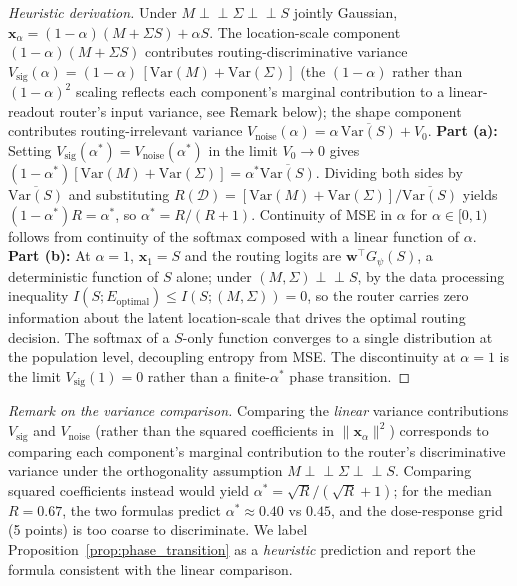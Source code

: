\documentclass{article}
\begin{document}
\begin{proof}[Heuristic derivation]
Under $M\perp\!\!\!\perp\Sigma\perp\!\!\!\perp S$ jointly Gaussian, $\mathbf{x}_\alpha = (1{-}\alpha)(M + \Sigma S) + \alpha S$. The location-scale component $(1{-}\alpha)(M+\Sigma S)$ contributes routing-discriminative variance $V_\mathrm{sig}(\alpha) = (1{-}\alpha)\,[\mathrm{Var}(M){+}\mathrm{Var}(\Sigma)]$ (the $(1{-}\alpha)$ rather than $(1{-}\alpha)^2$ scaling reflects each component's marginal contribution to a linear-readout router's input variance, see Remark below); the shape component contributes routing-irrelevant variance $V_\mathrm{noise}(\alpha) = \alpha\,\overline{\mathrm{Var}(S)} + V_0$. \textbf{Part (a):} Setting $V_\mathrm{sig}(\alpha^*) = V_\mathrm{noise}(\alpha^*)$ in the limit $V_0\to 0$ gives $(1{-}\alpha^*)[\mathrm{Var}(M){+}\mathrm{Var}(\Sigma)] = \alpha^* \overline{\mathrm{Var}(S)}$. Dividing both sides by $\overline{\mathrm{Var}(S)}$ and substituting $R(\mathcal{D}) = [\mathrm{Var}(M){+}\mathrm{Var}(\Sigma)]/\overline{\mathrm{Var}(S)}$ yields $(1{-}\alpha^*)R = \alpha^*$, so $\alpha^* = R/(R+1)$. Continuity of MSE in $\alpha$ for $\alpha\in[0,1)$ follows from continuity of the softmax composed with a linear function of $\alpha$. \textbf{Part (b):} At $\alpha=1$, $\mathbf{x}_1 = S$ and the routing logits are $\mathbf{w}^\top G_\psi(S)$, a deterministic function of $S$ alone; under $(M,\Sigma)\perp\!\!\!\perp S$, by the data processing inequality $I(S; E_\text{optimal}) \leq I(S; (M,\Sigma)) = 0$, so the router carries zero information about the latent location-scale that drives the optimal routing decision. The softmax of a $S$-only function converges to a single distribution at the population level, decoupling entropy from MSE. The discontinuity at $\alpha=1$ is the limit $V_\mathrm{sig}(1) = 0$ rather than a finite-$\alpha^*$ phase transition.
\end{proof}

\emph{Remark on the variance comparison.} Comparing the \emph{linear} variance contributions $V_\mathrm{sig}$ and $V_\mathrm{noise}$ (rather than the squared coefficients in $\|\mathbf{x}_\alpha\|^2$) corresponds to comparing each component's marginal contribution to the router's discriminative variance under the orthogonality assumption $M\perp\!\!\!\perp\Sigma\perp\!\!\!\perp S$. Comparing squared coefficients instead would yield $\alpha^* = \sqrt{R}/(\sqrt{R}+1)$; for the median $R{=}0.67$, the two formulas predict $\alpha^* \approx 0.40$ vs $0.45$, and the dose-response grid (5 points) is too coarse to discriminate. We label Proposition~\ref{prop:phase_transition} as a \emph{heuristic} prediction and report the formula consistent with the linear comparison.
\end{document}
